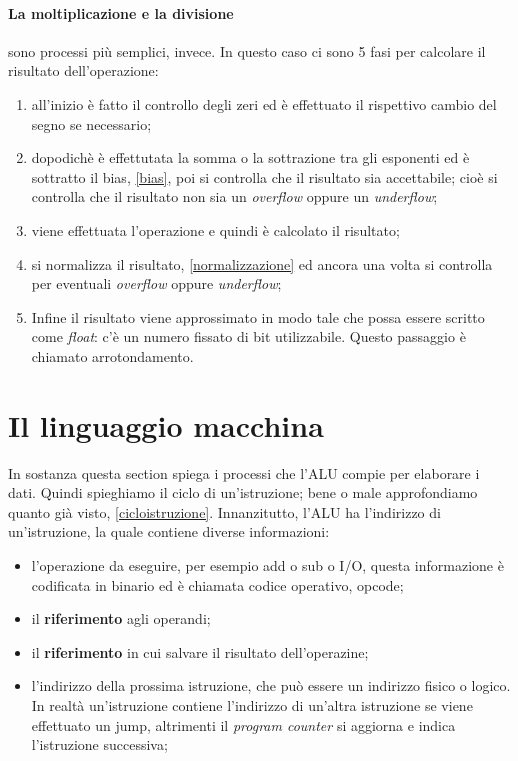 \documentclass{article}
\begin{document}
\paragraph{La moltiplicazione e la divisione} sono processi più semplici, invece.
In questo caso ci sono 5 fasi per calcolare il risultato dell'operazione:
\begin{enumerate}
	\item all'inizio è fatto il controllo degli zeri ed è effettuato il rispettivo cambio del segno se necessario;

	\item dopodichè è effettutata la somma o la sottrazione tra gli esponenti ed è sottratto il bias, \autoref{bias}, poi si controlla che il risultato sia accettabile; cioè si controlla che il risultato non sia un \textit{overflow} oppure un \textit{underflow};

	\item viene effettuata l'operazione e quindi è calcolato il risultato;

	\item si normalizza il risultato, \autoref{normalizzazione} ed ancora una volta si controlla per eventuali \textit{overflow} oppure \textit{underflow};

	\item Infine il risultato viene approssimato in modo tale che possa essere scritto come \textit{float}: c'è un numero fissato di bit utilizzabile. Questo passaggio è chiamato arrotondamento.
\end{enumerate}

\section{Il linguaggio macchina}
In sostanza questa section spiega i processi che l'ALU compie per elaborare i dati. Quindi spieghiamo il ciclo di un'istruzione; bene o male approfondiamo quanto già visto, \autoref{cicloistruzione}. Innanzitutto, l'ALU ha l'indirizzo di un'istruzione, la quale contiene diverse informazioni:

\begin{itemize}

	\item l'operazione da eseguire,  per esempio add o sub o I/O, questa informazione è codificata in binario ed è chiamata codice operativo, opcode;

	\item il \textbf{riferimento} agli operandi;

	\item il \textbf{riferimento} in cui salvare il risultato dell'operazine;

	\item l'indirizzo della prossima istruzione, che può essere un indirizzo fisico o logico. In realtà un'istruzione contiene l'indirizzo di un'altra istruzione se viene effettuato un jump, altrimenti il \textit{program counter} si aggiorna e indica l'istruzione successiva;

\end{itemize}
\end{document}
